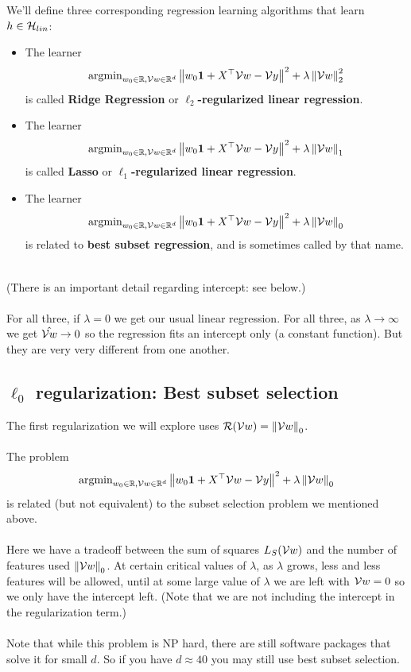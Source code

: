 We'll define three corresponding regression learning algorithms that learn $h\in\mathcal{H}_{lin}$:
\begin{itemize}
    \item The learner 
    \[
      \text{argmin}_{w_0\in\mathbb{R},\mathcal{V}{w}\in\mathbb{R}^{d}} \left\|  w_0\mathbf{1} + X^{\top}\mathcal{V}{w} -\mathcal{V}{y}  \right\|^2
+  \lambda \left\| \mathcal{V}{w}\right\|^2_2
    \]
    is called {\bf Ridge Regression} or {\bf $\ell_2$-regularized linear
    regression}.
 \item The learner 
    \[
      \text{argmin}_{w_0\in\mathbb{R},\mathcal{V}{w}\in\mathbb{R}^{d}} \left\|   w_0\mathbf{1} + X^{\top}\mathcal{V}{w} -\mathcal{V}{y}  \right\|^2
+  \lambda \left\| \mathcal{V}{w}\right\|_1
    \]
    is called {\bf Lasso} or {\bf $\ell_1$-regularized linear
    regression}.
  \item The learner 
    \[
      \text{argmin}_{w_0\in\mathbb{R},\mathcal{V}{w}\in\mathbb{R}^{d}} \left\|   w_0\mathbf{1} + X^{\top}\mathcal{V}{w} -\mathcal{V}{y}  \right\|^2
+  \lambda \left\| \mathcal{V}{w}\right\|_0
    \]
    is related to {\bf best subset regression}, and is sometimes called by 
    that name.
\end{itemize}
~\\
(There is an important detail regarding intercept: see below.)
\\~\\
For all three, if $\lambda=0$ we get our usual linear regression. 
For all three, as $\lambda \to \infty$ we get $\hat{\mathcal{V}{w}}\to 0$ so the
regression fits an intercept only (a constant function). 
But they are very very different from one another. 

\subsection{$\ell_0$ regularization: Best subset selection}

The first regularization we will explore uses $\mathcal{R}(\mathcal{V}{w}) = \left\| \mathcal{V}{w}\right\|_0$.
\\~\\
The problem
 \[
      \text{argmin}_{w_0\in\mathbb{R},\mathcal{V}{w}\in\mathbb{R}^{d}} \left\|   w_0\mathbf{1} + X^{\top}\mathcal{V}{w} -\mathcal{V}{y}  \right\|^2
+  \lambda \left\| \mathcal{V}{w}\right\|_0
    \]
is related (but not equivalent) to the subset selection problem we mentioned above.
\\~\\
Here we have a tradeoff between the sum of
squares $L_S(\mathcal{V}{w})$ and the number of features used $\left\| \mathcal{V}{w}\right\|_0$. At
certain critical values of $\lambda$, as $\lambda$ grows, less and less
features will be allowed, until at some large value of $\lambda$ we are left
with $\mathcal{V}{w}=0$ so we only have  the intercept left. (Note that we are not
including the intercept in the regularization term.) 
%
%
\\~\\
Note that while this problem is NP hard, there are still software packages that
solve it for small $d$. So if you have $d\approx 40$ you may still use best
subset selection. 

